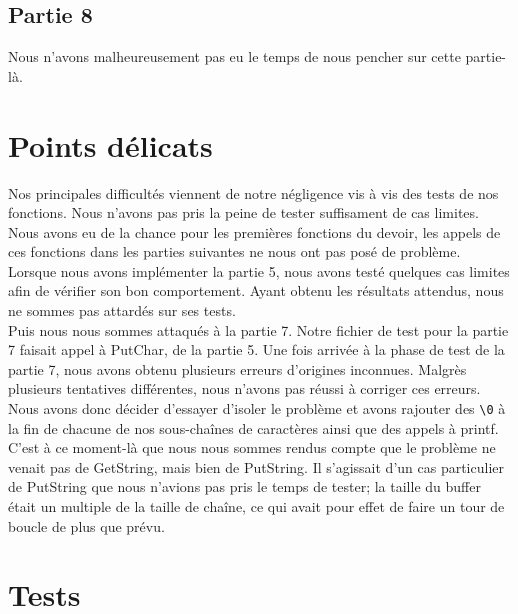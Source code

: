\documentclass[a4paper]{article}
\newcommand*{\escape}[1]{\texttt{\textbackslash#1}}
\begin{document}
\subsection{Partie 8}
Nous n'avons malheureusement pas eu le temps de nous pencher sur cette partie-là.


\newpage
\section{Points délicats}

Nos principales difficultés viennent de notre négligence vis à vis des tests de
nos fonctions. Nous n'avons pas pris la peine de tester suffisament de cas limites.
Nous avons eu de la chance pour les premières fonctions du devoir, les appels de
ces fonctions dans les parties suivantes ne nous ont pas posé de problème. \\

Lorsque nous avons implémenter la partie 5, nous avons testé quelques cas limites
afin de vérifier son bon comportement. Ayant obtenu les résultats attendus, nous
ne sommes pas attardés sur ses tests. \\

Puis nous nous sommes attaqués à la partie 7. Notre fichier de test pour la partie
7 faisait appel à PutChar, de la partie 5. Une fois arrivée à la phase de test de
la partie 7, nous avons obtenu plusieurs erreurs d'origines inconnues. Malgrès
plusieurs tentatives différentes, nous n'avons pas réussi à corriger ces erreurs.
Nous avons donc décider d'essayer d'isoler le problème et avons rajouter des \escape{0}
à la fin de chacune de nos sous-chaînes de caractères ainsi que des appels à printf.
C'est à ce moment-là que nous nous sommes rendus compte que le problème ne venait
pas de GetString, mais bien de PutString. Il s'agissait d'un cas particulier de
PutString que nous n'avions pas pris le temps de tester; la taille du buffer était
un multiple de la taille de chaîne, ce qui avait pour effet de faire un tour de boucle
de plus que prévu.\\


\section{Tests}
\end{document}
